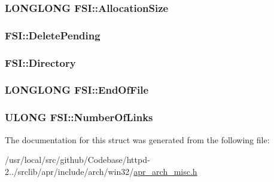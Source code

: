 \subsubsection[{\texorpdfstring{Allocation\+Size}{AllocationSize}}]{\setlength{\rightskip}{0pt plus 5cm}L\+O\+N\+G\+L\+O\+NG F\+S\+I\+::\+Allocation\+Size}\hypertarget{structFSI_ad4c33115c6f5c1077bcdc8cb1fb6d599}{}\label{structFSI_ad4c33115c6f5c1077bcdc8cb1fb6d599}
\subsubsection[{\texorpdfstring{Delete\+Pending}{DeletePending}}]{ F\+S\+I\+::\+Delete\+Pending}\hypertarget{structFSI_a7a518162b2055fc67146af410926f619}{}\label{structFSI_a7a518162b2055fc67146af410926f619}
\subsubsection[{\texorpdfstring{Directory}{Directory}}]{ F\+S\+I\+::\+Directory}\hypertarget{structFSI_a0eff3a234660d8b546ace06282e9bdda}{}\label{structFSI_a0eff3a234660d8b546ace06282e9bdda}
\subsubsection[{\texorpdfstring{End\+Of\+File}{EndOfFile}}]{\setlength{\rightskip}{0pt plus 5cm}L\+O\+N\+G\+L\+O\+NG F\+S\+I\+::\+End\+Of\+File}\hypertarget{structFSI_a09bc17bd09b207aac72e050b25823649}{}\label{structFSI_a09bc17bd09b207aac72e050b25823649}
\subsubsection[{\texorpdfstring{Number\+Of\+Links}{NumberOfLinks}}]{\setlength{\rightskip}{0pt plus 5cm}U\+L\+O\+NG F\+S\+I\+::\+Number\+Of\+Links}\hypertarget{structFSI_a421a503e1ec3e89b0ad3e267157b3d2a}{}\label{structFSI_a421a503e1ec3e89b0ad3e267157b3d2a}


The documentation for this struct was generated from the following file\+:\begin{DoxyCompactItemize}
\item 
/usr/local/src/github/\+Codebase/httpd-\/2../srclib/apr/include/arch/win32/\hyperlink{win32_2apr__arch__misc_8h}{apr\+\_\+arch\+\_\+misc.\+h}\end{DoxyCompactItemize}
